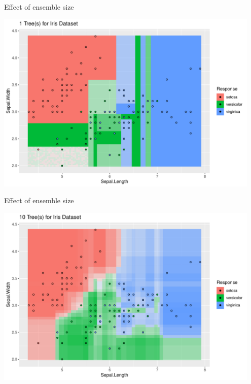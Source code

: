 \documentclass[11pt,compress,t,notes=noshow, xcolor=table]{beamer}
\begin{document}

\begin{vbframe}{Effect of ensemble size}

  {\centering \includegraphics[width=0.95\textwidth]{figure/cart_forest_intro_1}}
\end{vbframe}

\begin{vbframe}{Effect of ensemble size}
\addtocounter{framenumber}{-1}
{\centering \includegraphics[width=0.95\textwidth]{figure/cart_forest_intro_2}}
\end{vbframe}
\end{document}
